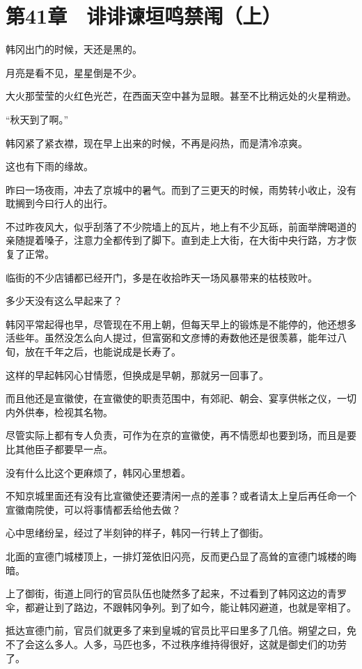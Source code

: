 \section{第41章　诽诽谏垣鸣禁闱（上）}

韩冈出门的时候，天还是黑的。

月亮是看不见，星星倒是不少。

大火那莹莹的火红色光芒，在西面天空中甚为显眼。甚至不比稍远处的火星稍逊。

“秋天到了啊。”

韩冈紧了紧衣襟，现在早上出来的时候，不再是闷热，而是清冷凉爽。

这也有下雨的缘故。

昨曰一场夜雨，冲去了京城中的暑气。而到了三更天的时候，雨势转小收止，没有耽搁到今曰行人的出行。

不过昨夜风大，似乎刮落了不少院墙上的瓦片，地上有不少瓦砾，前面举牌喝道的亲随提着嗓子，注意力全都传到了脚下。直到走上大街，在大街中央行路，方才恢复了正常。

临街的不少店铺都已经开门，多是在收拾昨天一场风暴带来的枯枝败叶。

多少天没有这么早起来了？

韩冈平常起得也早，尽管现在不用上朝，但每天早上的锻炼是不能停的，他还想多活些年。虽然没怎么向人提过，但富弼和文彦博的寿数他还是很羡慕，能年过八旬，放在千年之后，也能说成是长寿了。

这样的早起韩冈心甘情愿，但换成是早朝，那就另一回事了。

而且他还是宣徽使，在宣徽使的职责范围中，有郊祀、朝会、宴享供帐之仪，一切内外供奉，检视其名物。

尽管实际上都有专人负责，可作为在京的宣徽使，再不情愿却也要到场，而且是要比其他臣子都要早一点。

没有什么比这个更麻烦了，韩冈心里想着。

不知京城里面还有没有比宣徽使还要清闲一点的差事？或者请太上皇后再任命一个宣徽南院使，可以将事情都丢给他去做？

心中思绪纷呈，经过了半刻钟的样子，韩冈一行转上了御街。

北面的宣德门城楼顶上，一排灯笼依旧闪亮，反而更凸显了高耸的宣德门城楼的晦暗。

上了御街，街道上同行的官员队伍也陡然多了起来，不过看到了韩冈这边的青罗伞，都避让到了路边，不跟韩冈争列。到了如今，能让韩冈避道，也就是宰相了。

抵达宣德门前，官员们就更多了来到皇城的官员比平曰里多了几倍。朔望之曰，免不了会这么多人。人多，马匹也多，不过秩序维持得很好，这就是御史们的功劳了。

